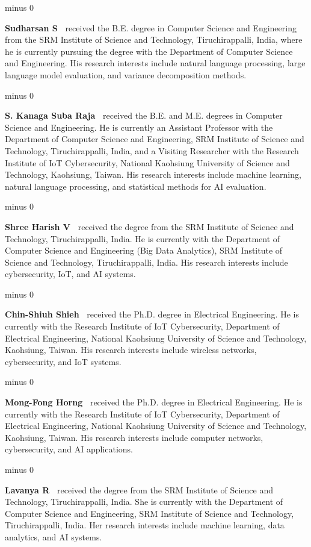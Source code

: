 \documentclass{ieeeaccess}
\makeatletter
\theoremstyle{definition}
\theoremstyle{plain}
\renewenvironment{IEEEbiographynophoto}[1]{%
  \normalfont\@IEEEcompsoconly{\sffamily}\footnotesize\interlinepenalty500%
  \vskip 1\baselineskip minus 0\baselineskip%
  \parskip=0pt\par%
  \noindent\textbf{#1\ }\@IEEEgobbleleadPARNLSP}{\relax\par\normalfont}
\makeatother
\begin{document}
\begin{IEEEbiographynophoto}{Sudharsan S}
received the B.E. degree in Computer Science and Engineering from the SRM Institute of Science and Technology, Tiruchirappalli, India, where he is currently pursuing the degree with the Department of Computer Science and Engineering. His research interests include natural language processing, large language model evaluation, and variance decomposition methods.
\end{IEEEbiographynophoto}

\begin{IEEEbiographynophoto}{S. Kanaga Suba Raja}
received the B.E. and M.E. degrees in Computer Science and Engineering. He is currently an Assistant Professor with the Department of Computer Science and Engineering, SRM Institute of Science and Technology, Tiruchirappalli, India, and a Visiting Researcher with the Research Institute of IoT Cybersecurity, National Kaohsiung University of Science and Technology, Kaohsiung, Taiwan. His research interests include machine learning, natural language processing, and statistical methods for AI evaluation.
\end{IEEEbiographynophoto}

\begin{IEEEbiographynophoto}{Shree Harish V}
received the degree from the SRM Institute of Science and Technology, Tiruchirappalli, India. He is currently with the Department of Computer Science and Engineering (Big Data Analytics), SRM Institute of Science and Technology, Tiruchirappalli, India. His research interests include cybersecurity, IoT, and AI systems.
\end{IEEEbiographynophoto}

\begin{IEEEbiographynophoto}{Chin-Shiuh Shieh}
received the Ph.D. degree in Electrical Engineering. He is currently with the Research Institute of IoT Cybersecurity, Department of Electrical Engineering, National Kaohsiung University of Science and Technology, Kaohsiung, Taiwan. His research interests include wireless networks, cybersecurity, and IoT systems.
\end{IEEEbiographynophoto}

\begin{IEEEbiographynophoto}{Mong-Fong Horng}
received the Ph.D. degree in Electrical Engineering. He is currently with the Research Institute of IoT Cybersecurity, Department of Electrical Engineering, National Kaohsiung University of Science and Technology, Kaohsiung, Taiwan. His research interests include computer networks, cybersecurity, and AI applications.
\end{IEEEbiographynophoto}

\begin{IEEEbiographynophoto}{Lavanya R}
received the degree from the SRM Institute of Science and Technology, Tiruchirappalli, India. She is currently with the Department of Computer Science and Engineering, SRM Institute of Science and Technology, Tiruchirappalli, India. Her research interests include machine learning, data analytics, and AI systems.
\end{IEEEbiographynophoto}



\EOD
\end{document}
